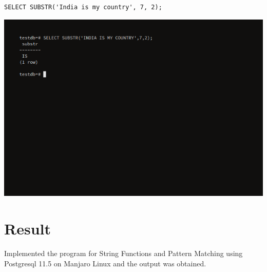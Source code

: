 \begin{enumerate}
\begin{verbatim}
SELECT SUBSTR('India is my country', 7, 2);

\end{verbatim}
\newline
\includegraphics[width=\linewidth]{../Images/Strings/21.png}
\end{enumerate}

\section{Result}
Implemented the program for String Functions and Pattern Matching using Postgresql 11.5 on Manjaro Linux and the output was obtained.